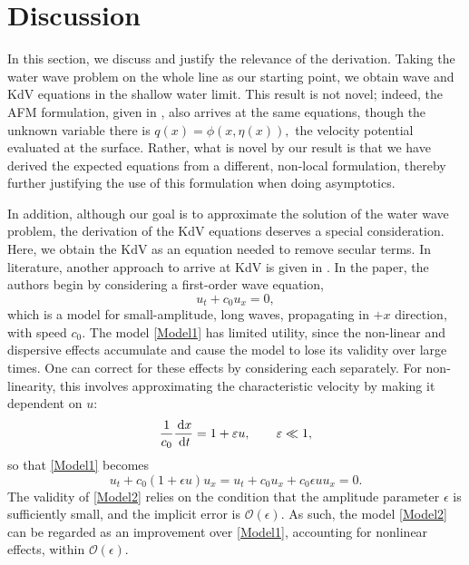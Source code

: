 
\chapter{Discussion} %

\label{Chapter4} %

In this section, we discuss and justify the relevance of the derivation. Taking the water wave problem on the whole line as our starting point, we obtain wave and KdV equations in the shallow water limit. This result is not novel; indeed, the AFM formulation, given in \cite{AFM2006}, also arrives at the same equations, though the unknown variable there is $q(x) = \phi(x,\eta(x)),$ the velocity potential evaluated at the surface. Rather, what is novel by our result is that we have derived the expected equations from a different, non-local formulation, thereby further justifying the use of this formulation when doing asymptotics. 

In addition, although our goal is to approximate the solution of the water wave problem, the derivation of the KdV equations deserves a special consideration. Here, we obtain the KdV as an equation needed to remove secular terms. In literature, another approach to arrive at KdV is given in \cite{BBM1972}. In the paper, the authors begin by considering a first-order wave equation,
\begin{equation}\label{Model1}
u_t + c_0 u_x = 0,
\end{equation} 
which is a model for small-amplitude, long waves, propagating in $+x$ direction, with speed $c_0.$ The model \eqref{Model1} has limited utility, since the non-linear and dispersive effects accumulate and cause the model to lose its validity over large times.  One can correct for these effects by considering each separately. For non-linearity, this involves approximating the characteristic velocity by making it dependent on $u:$
\[ \frac{1}{c_0} \frac{\,\mathrm{d} x}{\,\mathrm{d} t} = 1 +  \varepsilon u, \qquad \varepsilon \ll 1,\]
so that \eqref{Model1} becomes
\begin{equation}\label{Model2}
u_t + c_0 (1+ \epsilon u)u_x = u_t + c_0 u_x + c_0 \epsilon u u_x  = 0.
\end{equation}
The validity of \eqref{Model2} relies on the condition that the amplitude parameter $\epsilon$ is sufficiently small, and the implicit error is $\mathcal{O}(\epsilon).$ As such, the model \eqref{Model2} can be regarded as an improvement over \eqref{Model1}, accounting for nonlinear effects, within $\mathcal{O}(\epsilon).$ 

